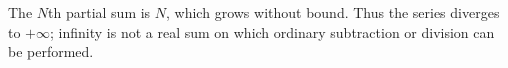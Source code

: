 The $N$th partial sum is $N$, which grows without bound. Thus the series diverges to $+\infty$; infinity is not a real sum on which ordinary subtraction or division can be performed.
